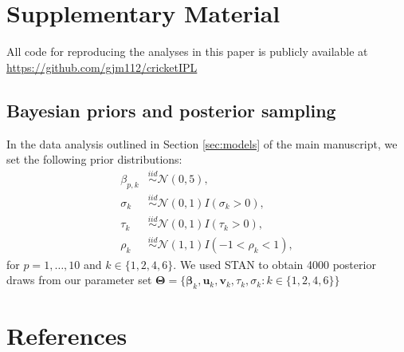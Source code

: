 \documentclass[
  12pt,
]{article}
\begin{document}
\hypertarget{supplementary-material}{%
\section*{Supplementary Material}\label{supplementary-material}}

All code for reproducing the analyses in this paper is publicly
available at \url{https://github.com/gjm112/cricketIPL}

\hypertarget{bayesian-priors-and-posterior-sampling}{%
\subsection{Bayesian priors and posterior
sampling}\label{bayesian-priors-and-posterior-sampling}}

In the data analysis outlined in Section \ref{sec:models} of the main
manuscript, we set the following prior distributions: \begin{align}
  \beta_{p,k} & \overset{iid}{\sim}\mathcal{N}(0,5),\nonumber\\
  \sigma_{k} & \overset{iid}{\sim}\mathcal{N}(0,1)I(\sigma_{k} > 0),\nonumber\\
  \tau_{k} & \overset{iid}{\sim}\mathcal{N}(0,1)I(\tau_{k} > 0),\nonumber\\
  \rho_{k} & \overset{iid}{\sim}\mathcal{N}(1,1)I(-1 < \rho_{k} < 1),
\end{align} for \(p = 1,\dots,10\) and \(k \in \{1,2,4,6\}\). We used
STAN to obtain 4000 posterior draws from our parameter set
\(\boldsymbol{\Theta} = \{\boldsymbol{\beta}_k,\boldsymbol{u}_k, \boldsymbol{v}_k,\tau_k,\sigma_k: k \in \{1,2,4,6\}\}\)

\hypertarget{references}{%
\section{References}\label{references}}
\end{document}
